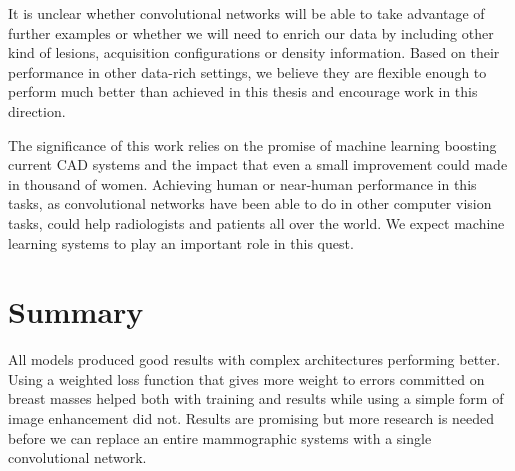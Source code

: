 It is unclear whether convolutional networks will be able to take advantage of further examples or whether we will need to enrich our data by including other kind of lesions, acquisition configurations or density information. Based on their performance in other data-rich settings, we believe they are flexible enough to perform much better than achieved in this thesis and encourage work in this direction.

The significance of this work relies on the promise of machine learning boosting current CAD systems and the impact that even a small improvement could made in thousand of women. Achieving human or near-human performance in this tasks, as convolutional networks have been able to do in other computer vision tasks, could help radiologists and patients all over the world. We expect machine learning systems to play an important role in this quest.

\section{Summary}
All models produced good results with complex architectures performing better. Using a weighted loss function that gives more weight to errors committed on breast masses helped both with training and results while using a simple form of image enhancement did not. Results are promising but more research is needed before we can replace an entire mammographic systems with a single convolutional network.
